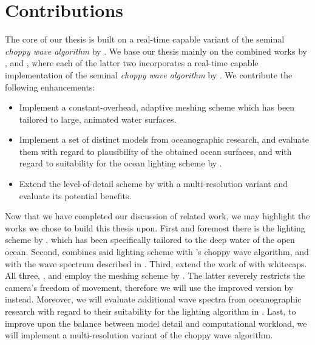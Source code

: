 \section{Contributions}
\textcolor{changed}{
The core of our thesis is built on a real-time capable variant
\citep{misc:oceanlightingfft} of the seminal \emph{choppy wave algorithm}
by \citet{course:simulatingocean}.
%
We base our thesis mainly on the combined works by
\citet{article:oceanlighting,misc:oceanlightingfft}, and
\citet{article:whitecaps}, where each of the latter two incorporates
a real-time capable implementation of the seminal \emph{choppy wave
algorithm} by \citet{course:simulatingocean}.
We contribute the following enhancements:
\begin{itemize}
	\item Implement a constant-overhead, adaptive meshing scheme
	\citep{thesis:johanson} which has been tailored to large,
	animated water surfaces.
	\item Implement a set of distinct models from oceanographic
	research, and evaluate them with regard to plausibility
	of the obtained ocean surfaces, and with regard to suitability
	for the	ocean lighting scheme by \citet{article:oceanlighting}.
	\item Extend the level-of-detail scheme by
	\citet{misc:oceanlightingfft} with a multi-resolution variant
	and evaluate its potential benefits.
\end{itemize}
}
%
\textcolor{changed}{
Now that we have completed our discussion of related work,
we may highlight the works we chose to build this thesis upon.
First and foremost there is the lighting scheme by
\citet{article:oceanlighting}, which has been specifically tailored
to the deep water of the open ocean. Second, \citet{misc:oceanlightingfft}
combines said lighting scheme with \citeauthor{course:simulatingocean}'s choppy wave algorithm, and with the wave spectrum described in \citet{article:Elfouhaily1997}. Third, \citet{article:whitecaps} extend the work of \citet{misc:oceanlightingfft} with whitecaps.
All three, \citet{article:oceanlighting, misc:oceanlightingfft}, and \cite{article:whitecaps} employ the meshing scheme by \citet{Hinsinger:2002}. The latter severely restricts the camera's
freedom of movement, therefore we will use the improved
version by \citet{thesis:johanson} instead.
Moreover, we will evaluate additional wave spectra from oceanographic research with regard to their suitability for the lighting
algorithm in \citet{misc:oceanlightingfft}. Last, to improve upon the
balance between model detail and computational workload, we will
implement a multi-resolution variant of the choppy wave algorithm.
}
